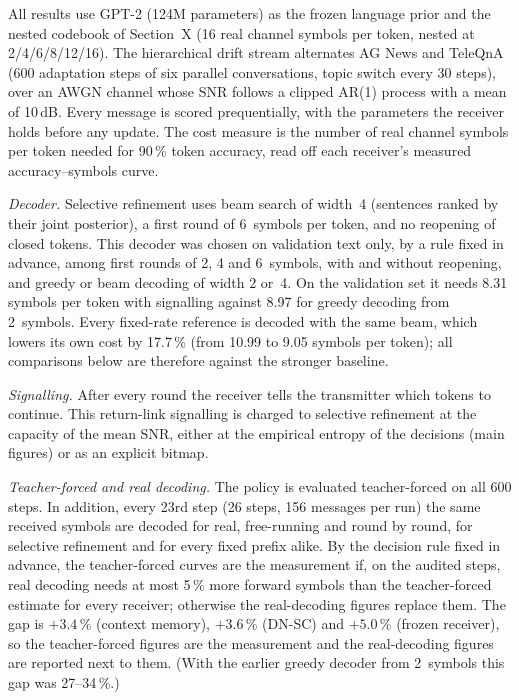 All results use GPT-2 (124M parameters) as the frozen language prior and the
nested codebook of Section~X (16 real channel symbols per token, nested at
2/4/6/8/12/16). The hierarchical drift stream alternates AG News and TeleQnA
(600 adaptation steps of six parallel conversations, topic switch every 30
steps), over an AWGN channel whose SNR follows a clipped AR(1) process with a
mean of 10\,dB. Every message is scored prequentially, with the parameters the
receiver holds before any update. The cost measure is the number of real
channel symbols per token needed for 90\,\% token accuracy, read off each
receiver's measured accuracy--symbols curve.

\emph{Decoder.} Selective refinement uses beam search of width~4 (sentences
ranked by their joint posterior), a first round of 6~symbols per token, and no
reopening of closed tokens. This decoder was chosen on validation text only,
by a rule fixed in advance, among first rounds of 2, 4 and 6~symbols, with and
without reopening, and greedy or beam decoding of width 2 or~4. On the
validation set it needs 8.31 symbols per token with signalling against 8.97
for greedy decoding from 2~symbols. Every fixed-rate reference is decoded with
the same beam, which lowers its own cost by 17.7\,\% (from 10.99 to 9.05
symbols per token); all comparisons below are therefore against the stronger
baseline.

\emph{Signalling.} After every round the receiver tells the transmitter which
tokens to continue. This return-link signalling is charged to selective
refinement at the capacity of the mean SNR, either at the empirical entropy of
the decisions (main figures) or as an explicit bitmap.

\emph{Teacher-forced and real decoding.} The policy is evaluated teacher-forced
on all 600 steps. In addition, every 23rd step (26 steps, 156 messages per run)
the same received symbols are decoded for real, free-running and round by
round, for selective refinement and for every fixed prefix alike. By the
decision rule fixed in advance, the teacher-forced curves are the measurement
if, on the audited steps, real decoding needs at most 5\,\% more forward
symbols than the teacher-forced estimate for every receiver; otherwise the
real-decoding figures replace them. The gap is $+3.4$\,\% (context memory),
$+3.6$\,\% (DN-SC) and $+5.0$\,\% (frozen receiver), so the teacher-forced
figures are the measurement and the real-decoding figures are reported next to
them. (With the earlier greedy decoder from 2~symbols this gap was
27--34\,\%.)

